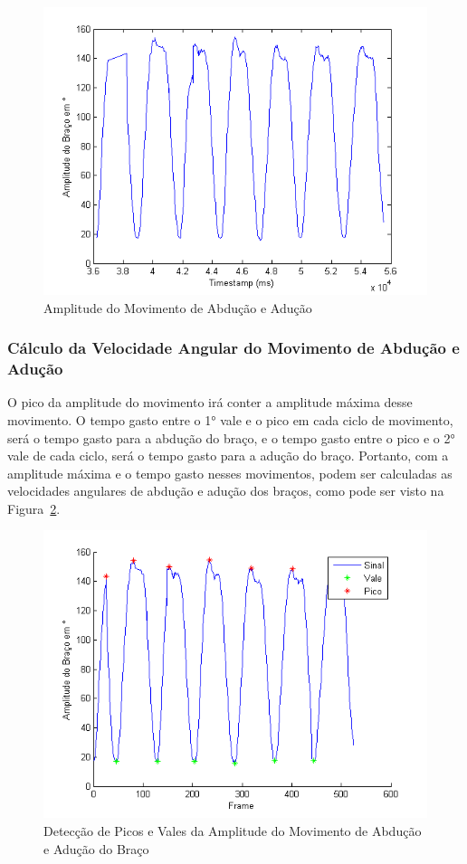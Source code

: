 \begin{figure}[!htb]
     \centering
     \includegraphics[width=1\textwidth]{./img/amplitude-braco.png}
     \caption{Amplitude do Movimento de Abdução e Adução}
     \label{img:amplitude_braco}
\end{figure}

\subsubsection{Cálculo da Velocidade Angular do Movimento de Abdução e Adução}
O pico da amplitude do movimento irá conter a amplitude máxima desse movimento. O tempo gasto entre o 1° vale e o pico em cada ciclo de movimento, será o tempo gasto para a abdução do braço, e o tempo gasto entre o pico e o 2° vale de cada ciclo, será o tempo gasto para a adução do braço. Portanto, com a amplitude máxima e o tempo gasto nesses movimentos, podem ser calculadas as velocidades angulares de abdução e adução dos braços, como pode ser visto na Figura~\ref{img:amplitude_braco_picos_vales}.
\begin{figure}[!htb]
     \centering
     \includegraphics[width=1\textwidth]{./img/amplitude-braco-picos.png}
     \caption{Detecção de Picos e Vales da Amplitude do Movimento de Abdução e Adução do Braço}
     \label{img:amplitude_braco_picos_vales}
\end{figure}

